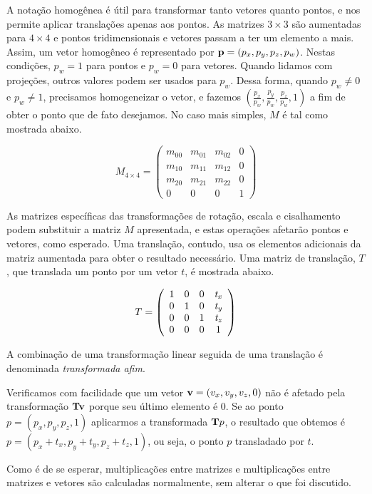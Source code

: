 \documentclass[12pt, a4paper, oneside]{book}
\begin{document}
A notação homogênea é útil para transformar tanto vetores quanto pontos, e nos permite aplicar translações apenas aos pontos. As matrizes $3 \times 3$ são aumentadas para $4 \times 4$ e pontos tridimensionais e vetores passam a ter um elemento a mais. Assim, um vetor homogêneo é representado por ${\bf p} = (p_{x}, p_{y}, p_{z}, p_{w})$. Nestas condições, $p_{w} = 1$ para pontos e $p_{w} = 0$ para vetores. Quando lidamos com projeções, outros valores podem ser usados para $p_{w}$. Dessa forma, quando $p_{w} \neq 0$ e $p_{w} \neq 1$, precisamos homogeneizar o vetor, e fazemos $(\frac{p_{x}}{p_{w}}, \frac{p_{y}}{p_{w}}, \frac{p_{z}}{p_{w}}, 1)$ a fim de obter o ponto que de fato desejamos. No caso mais simples, $M$ é tal como mostrada abaixo.

\[ M_{4 \times 4} = \left(
\begin{array}{cccc}
m_{00} & m_{01} & m_{02} & 0 \\
m_{10} & m_{11} & m_{12} & 0 \\
m_{20} & m_{21} & m_{22} & 0 \\
0 & 0 & 0 & 1 
\end{array} \right)
\]

As matrizes específicas das transformações de rotação, escala e cisalhamento podem substituir a matriz $M$ apresentada, e estas operações afetarão pontos e vetores, como esperado. Uma translação, contudo, usa os elementos adicionais da matriz aumentada para obter o resultado necessário. Uma matriz de translação, $T$, que translada um ponto por um vetor $t$, é mostrada abaixo.

\[ T = \left(
\begin{array}{cccc}
1 & 0 & 0 & {\it t_{x}} \\
0 & 1 & 0 & {\it t_{y}} \\
0 & 0 & 1 & {\it t_{z}} \\
0 & 0 & 0 & 1 
\end{array} \right)
\]

A combinação de uma transformação linear seguida de uma translação é denominada {\it transformada afim}.

Verificamos com facilidade que um vetor ${\bf v} = (v_{x},v_{y},v_{z},0)$ não é afetado pela transformação ${\bf Tv}$ porque seu último elemento é 0. Se ao ponto $p= (p_{x},p_{y},p_{z},1)$ aplicarmos a transformada ${\bf T}p$, o resultado que obtemos é $p= (p_{x} + t_{x},p_{y} + t_{y},p_{z} + t_{z},1)$, ou seja, o ponto $p$ transladado por $t$.

Como é de se esperar, multiplicações entre matrizes e multiplicações entre matrizes e vetores são calculadas normalmente, sem alterar o que foi discutido.
\end{document}
